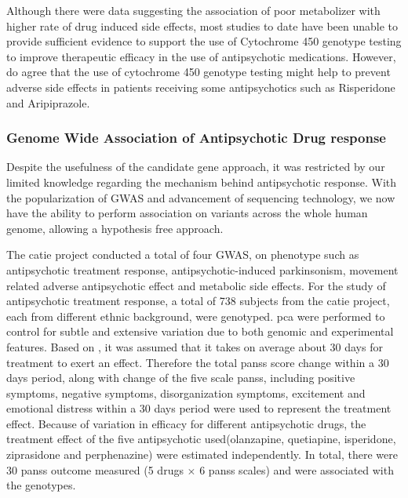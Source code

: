 	Although there were data suggesting the association of poor metabolizer with higher rate of drug induced side effects\citep{Ravyn2013}, most studies to date have been unable to provide sufficient evidence to support the use of Cytochrome 450 genotype testing to improve therapeutic
	efficacy in the use of antipsychotic medications\citep{Ravyn2013}.
	However, \citet{Ravyn2013} do agree that the use of cytochrome 450 genotype testing might help to prevent adverse side effects in patients receiving some antipsychotics such as Risperidone and Aripiprazole.
	
	\subsubsection{Genome Wide Association of Antipsychotic Drug response}
	Despite the usefulness of the candidate gene approach, it was restricted by our limited knowledge regarding the mechanism behind antipsychotic response.
	With the popularization of \gls{GWAS} and advancement of sequencing technology, we now have the ability to perform association on variants across the whole human genome, allowing a hypothesis free approach.
	
	The \gls{catie} project conducted a total of four \gls{GWAS}, on phenotype such as antipsychotic treatment response\citep{McClay2011}, antipsychotic-induced
	parkinsonism\citep{Alkelai2009}, movement related adverse antipsychotic effect\citep{Aberg2010} and metabolic side effects\citep{Adkins2011}.
	For the study of antipsychotic treatment response\citep{McClay2011}, a total of 738 subjects from the \gls{catie} project, each from different ethnic background, were genotyped.
	\Gls{pca} were performed to control for subtle and extensive variation due to both genomic and experimental features.
	Based on \citet{VandenOord2009}, it was assumed that it takes on average about 30 days for treatment to exert an effect. 
	Therefore the total \gls{panss} score change within a 30 days period, along with change of the five scale \gls{panss}, including positive symptoms, negative symptoms, disorganization symptoms, excitement and emotional distress within a 30 days period were used to represent the treatment effect.
	Because of variation in efficacy for different antipsychotic drugs, the treatment effect of the five antipsychotic used(olanzapine, quetiapine, isperidone, ziprasidone and perphenazine) were estimated independently. 
	In total, there were 30 \gls{panss} outcome measured (5 drugs $\times$ 6 \gls{panss} scales) and were associated with the genotypes.
	
